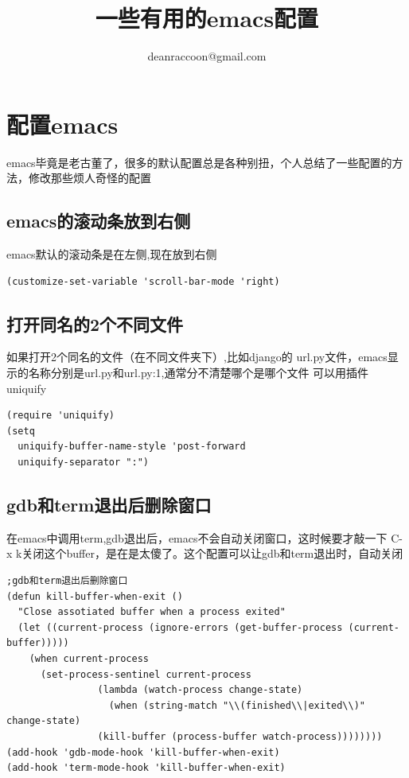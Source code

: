 \documentclass[adobefonts]{ctexart}
\title{\textbf{一些有用的emacs配置}}
\author{deanraccoon@gmail.com}
\begin{document}
\maketitle
\tableofcontents

\newpage

\section{配置emacs}
emacs毕竟是老古董了，很多的默认配置总是各种别扭，个人总结了一些配置的方法，修改那些烦人奇怪的配置
\subsection{emacs的滚动条放到右侧}
emacs默认的滚动条是在左侧,现在放到右侧
\begin{verbatim}
(customize-set-variable 'scroll-bar-mode 'right)
\end{verbatim}
\subsection{打开同名的2个不同文件}
如果打开2个同名的文件（在不同文件夹下）,比如django的
url.py文件，emacs显示的名称分别是url.py和url.py:1,通常分不清楚哪个是哪个文件
可以用插件uniquify

\begin{verbatim}
(require 'uniquify)
(setq
  uniquify-buffer-name-style 'post-forward
  uniquify-separator ":")
\end{verbatim}
\subsection{gdb和term退出后删除窗口}
在emacs中调用term,gdb退出后，emacs不会自动关闭窗口，这时候要才敲一下
C-x k关闭这个buffer，是在是太傻了。这个配置可以让gdb和term退出时，自动关闭
\begin{verbatim}
;gdb和term退出后删除窗口
(defun kill-buffer-when-exit ()
  "Close assotiated buffer when a process exited"
  (let ((current-process (ignore-errors (get-buffer-process (current-buffer)))))
    (when current-process
      (set-process-sentinel current-process
			    (lambda (watch-process change-state)
			      (when (string-match "\\(finished\\|exited\\)" change-state)
				(kill-buffer (process-buffer watch-process))))))))
(add-hook 'gdb-mode-hook 'kill-buffer-when-exit)
(add-hook 'term-mode-hook 'kill-buffer-when-exit)
\end{verbatim}
\end{document}
